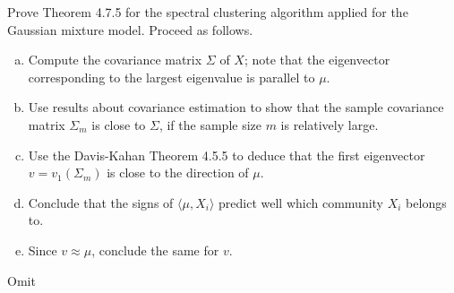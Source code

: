 \begin{problem*}[Exercise 4.7.6]\label{ex4.7.6}
	Prove Theorem 4.7.5 for the spectral clustering algorithm applied for the Gaussian mixture model. Proceed as follows.
	\begin{enumerate}[(a)]
		\item Compute the covariance matrix \(\Sigma \) of \(X\); note that the eigenvector corresponding to the largest eigenvalue is parallel to \(\mu \).
		\item Use results about covariance estimation to show that the sample covariance matrix \(\Sigma _m\) is close to \(\Sigma \), if the sample size \(m\) is relatively large.
		\item Use the Davis-Kahan Theorem 4.5.5 to deduce that the first eigenvector \(v = v_1(\Sigma _m)\) is close to the direction of \(\mu \).
		\item Conclude that the signs of \(\langle \mu , X_i \rangle \) predict well which community \(X_i\) belongs to.
		\item Since \(v \approx \mu \), conclude the same for \(v\).
	\end{enumerate}
\end{problem*}
\begin{answer}
	Omit
\end{answer}